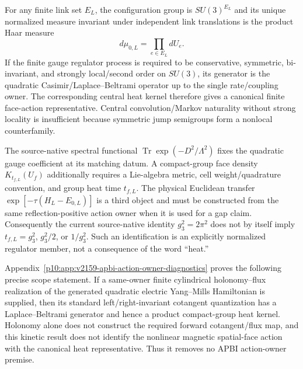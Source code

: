 \documentclass[12pt,a4paper]{article}
\begin{document}
\begin{theorem}
\label{p10:thm:canonical-haar-heat-representative}
For any finite link set $E_L$, the configuration group is
$SU(3)^{E_L}$ and its unique normalized measure invariant under independent
link translations is the product Haar measure
\[
 \boxed{d\mu_{0,L}=\prod_{e\in E_L}dU_e.}
\]
If the finite gauge regulator process is required to be conservative,
symmetric, bi-invariant, and strongly local/second order on $SU(3)$, its
generator is the quadratic Casimir/Laplace--Beltrami operator up to the single
rate/coupling owner.  The corresponding central heat kernel therefore gives a
canonical finite face-action representative.  Central convolution/Markov
naturality without strong locality is insufficient because symmetric jump
semigroups form a nonlocal counterfamily.
\end{theorem}

\begin{remark}
\label{p10:rem:three-distinct-heat-parameters}
The source-native spectral functional
$\operatorname{Tr}\exp(-D^2/\Lambda^2)$ fixes the quadratic gauge coefficient
at its matching datum.  A compact-group face density $K_{t_{f,L}}(U_f)$
additionally requires a Lie-algebra metric, cell weight/quadrature convention,
and group heat time $t_{f,L}$.  The physical Euclidean transfer
$\exp[-\tau(H_L-E_{0,L})]$ is a third object and must be constructed from the
same reflection-positive action owner when it is used for a gap claim.
Consequently the current source-native identity $g_3^2=2\pi^2$ does not by
itself imply $t_{f,L}=g_3^2$, $g_3^2/2$, or $1/g_3^2$.  Such an identification
is an explicitly normalized regulator member, not a consequence of the word
``heat.''
\end{remark}

\begin{remark}
\label{p10:rem:v2159-electric-heat-scope}
Appendix~\ref{p10:app:v2159-apbi-action-owner-diagnostics} proves the following
precise scope statement.  If a same-owner finite cylindrical holonomy--flux
realization of the generated quadratic electric Yang--Mills Hamiltonian is
supplied, then its standard left/right-invariant cotangent quantization has a
Laplace--Beltrami generator and hence a product compact-group heat kernel.
Holonomy alone does not construct the required forward cotangent/flux map, and
this kinetic result does not identify the nonlinear magnetic spatial-face
action with the canonical heat representative.  Thus it removes no APBI
action-owner premise.
\end{remark}
\end{document}

